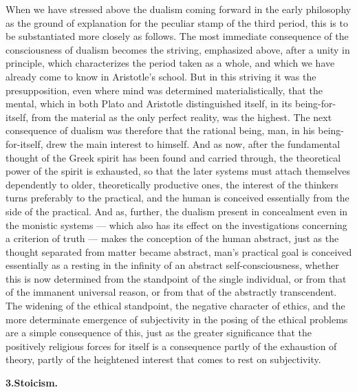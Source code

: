 When we have stressed above the dualism coming forward in the early philosophy
as the ground of explanation for the peculiar stamp of the third period, this
is to be substantiated more closely as follows. The most immediate consequence
of the consciousness of dualism becomes the striving, emphasized above, after
a unity in principle, which characterizes the period taken as a whole, and
which we have already come to know in Aristotle's school. But in this striving
it was the presupposition, even where mind was determined materialistically,
that the mental, which in both Plato and Aristotle distinguished itself, in
its being-for-itself, from the material as the only perfect reality, was the
highest. The next consequence of dualism was therefore that the rational
being, man, in his being-for-itself, drew the main interest to himself. And as
now, after the fundamental thought of the Greek spirit has been found and
carried through, the theoretical power of the spirit is exhausted, so that the
later systems must attach themselves dependently to older, theoretically
productive ones, the interest of the thinkers turns preferably to the
practical, and the human is conceived essentially from the side of the
practical. And as, further, the dualism present in concealment even in the
monistic systems --- which also has its effect on the investigations
concerning a criterion of truth --- makes the conception of the human
abstract, just as the thought separated from matter became abstract, man's
practical goal is conceived essentially as a resting in the infinity of an
abstract self-consciousness, whether this is now determined from the
standpoint of the single individual, or from that of the immanent universal
reason, or from that of the abstractly transcendent. The widening of the
ethical standpoint, the negative character of ethics, and the more
determinate emergence of subjectivity in the posing of the ethical problems
are a simple consequence of this, just as the greater significance that the
positively religious forces for itself is a consequence partly of the
exhaustion of theory, partly of the heightened interest that comes to rest on
subjectivity.

\divrule

\begin{center}
\textbf{3.\enspace Stoicism.}
\end{center}

